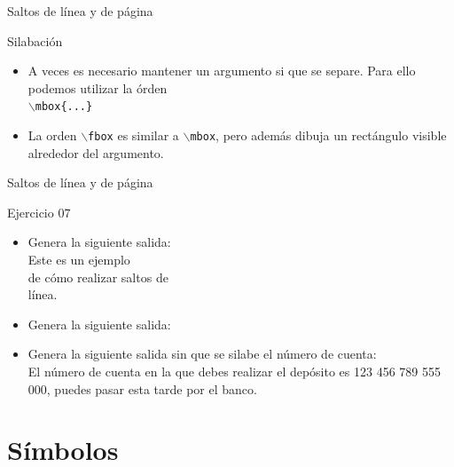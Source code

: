 \documentclass[10pt]{beamer}
\begin{document}
\begin{frame}{Saltos de línea y de página}
	\begin{block}{Silabación}
		\begin{itemize}
			\item A veces es necesario mantener un argumento si que se separe. Para ello podemos utilizar la órden \\
			\texttt{$\backslash$mbox\{...\}} 
			\item La orden \texttt{$\backslash$fbox} es similar a \texttt{$\backslash$mbox}, pero además dibuja un rectángulo visible alrededor del argumento.
		\end{itemize}
	\end{block}
\end{frame}

\begin{frame}{Saltos de línea y de página}
	\begin{exampleblock}{Ejercicio 07}
		\begin{itemize}
			\item Genera la siguiente salida: \\
			Este es un ejemplo \\
			de cómo \newline
			realizar saltos de \\
			línea.
			\item Genera la siguiente salida: \\
			\item Genera la siguiente salida sin que se silabe el número de cuenta:\\
			El número de cuenta en la que debes realizar el depósito es 123 456 789 555 000, puedes pasar esta tarde por el banco.
		\end{itemize}
	\end{exampleblock}
\end{frame}

\section{Símbolos}
\end{document}
